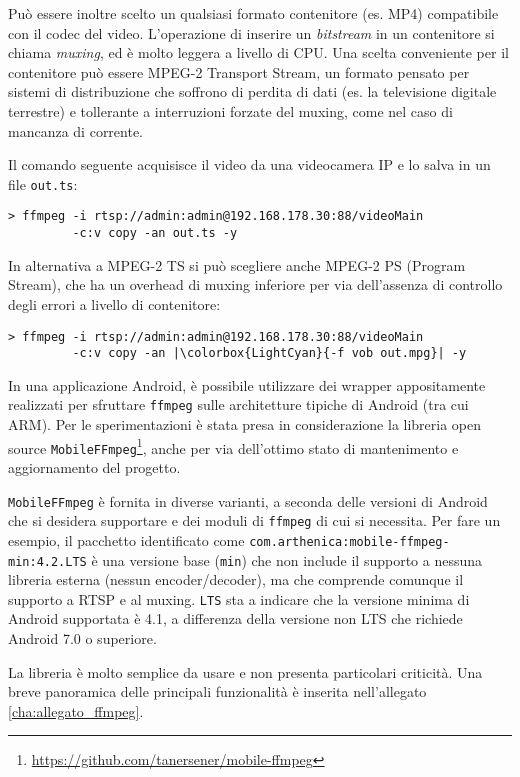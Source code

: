 Può essere inoltre scelto un qualsiasi formato contenitore (es. MP4) compatibile con il codec del video. L'operazione di inserire un \emph{bitstream} in un contenitore si chiama \emph{muxing}, ed è molto leggera a livello di CPU. Una scelta conveniente per il contenitore può essere MPEG-2 Transport Stream, un formato pensato per sistemi di distribuzione che soffrono di perdita di dati (es. la televisione digitale terrestre) e tollerante a interruzioni forzate del muxing, come nel caso di mancanza di corrente.

Il comando seguente acquisisce il video da una videocamera IP e lo salva in un file \texttt{out.ts}:

\begin{verbatim}
> ffmpeg -i rtsp://admin:admin@192.168.178.30:88/videoMain
         -c:v copy -an out.ts -y
\end{verbatim}

In alternativa a MPEG-2 TS si può scegliere anche MPEG-2 PS (Program Stream), che ha un overhead di muxing inferiore per via dell'assenza di controllo degli errori a livello di contenitore:

\begin{verbatim}
> ffmpeg -i rtsp://admin:admin@192.168.178.30:88/videoMain
         -c:v copy -an |\colorbox{LightCyan}{-f vob out.mpg}| -y
\end{verbatim}

In una applicazione Android, è possibile utilizzare dei wrapper appositamente realizzati per sfruttare \texttt{ffmpeg} sulle architetture tipiche di Android (tra cui ARM). Per le sperimentazioni è stata presa in considerazione la libreria open source \texttt{MobileFFmpeg}\footnote{\url{https://github.com/tanersener/mobile-ffmpeg}}, anche per via dell'ottimo stato di mantenimento e aggiornamento del progetto.

\texttt{MobileFFmpeg} è fornita in diverse varianti, a seconda delle versioni di Android che si desidera supportare e dei moduli di \texttt{ffmpeg} di cui si necessita. Per fare un esempio, il pacchetto identificato come \texttt{com.arthenica:mobile-ffmpeg-min:4.2.LTS} è una versione base (\texttt{min}) che non include il supporto a nessuna libreria esterna (nessun encoder/decoder), ma che comprende comunque il supporto a RTSP e al muxing. \texttt{LTS} sta a indicare che la versione minima di Android supportata è 4.1, a differenza della versione non LTS che richiede Android 7.0 o superiore.

La libreria è molto semplice da usare e non presenta particolari criticità. Una breve panoramica delle principali funzionalità è inserita nell'allegato \ref{cha:allegato_ffmpeg}.

